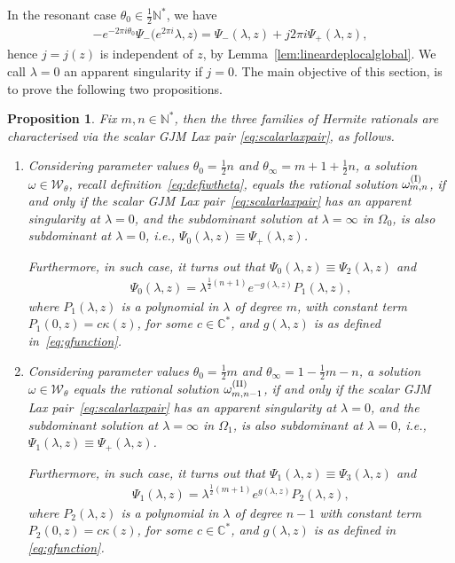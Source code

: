 \documentclass[pdftex]{sigma}
\numberwithin{equation}{section}
\newtheorem{pro}[thm]{Proposition}
\newcommand{\om}{\omega}
\newcommand{\la}{\lambda}
\begin{document}
In the resonant case $\theta_0\in \tfrac{1}{2}\mathbb{N}^*$, we have
\begin{gather*}
-e^{-2\pi i \theta_0}\Psi_-\big(e^{2\pi i}\lambda,z\big)=\Psi_-(\lambda,z)+j2\pi i \Psi_+(\lambda,z),
\end{gather*}
hence $j=j(z)$ is independent of $z$, by Lemma~\ref{lem:lineardeplocalglobal}. We call $\lambda=0$ an apparent singularity if $j=0$. The main objective of this section, is to prove the following two propositions.
\begin{pro}\label{pro:hermitecharacterisation}
	Fix $m,n\in\mathbb{N}^*$, then the three families of Hermite rationals are characterised via the scalar GJM Lax pair \eqref{eq:scalarlaxpair}, as follows.
	\begin{enumerate}[label={\rm H.\Roman*:}, ref={\rm H.\Roman*}]\itemsep=0pt
		\item Considering parameter values $\theta_0=\tfrac{1}{2}n$ and $\theta_\infty=m+1+\tfrac{1}{2}n$, a solution $\om\in \mathcal{W}_\theta$, recall definition~\eqref{eq:defiwtheta}, equals the rational solution $\om_{m,n}^{({\rm I})}$, if and only if the scalar GJM Lax pair~\eqref{eq:scalarlaxpair} has an apparent singularity at $\lambda=0$,
		and the subdominant solution at $\lambda=\infty$ in $\Omega_0$, is also subdominant at $\lambda=0$, i.e.,
		$\Psi_0(\lambda,z)\equiv \Psi_{+}(\lambda,z)$.
		
		Furthermore, in such case, it turns out that $\Psi_0(\lambda,z)\equiv \Psi_2(\lambda,z)$ and
		\begin{gather}\label{eq:h1psi0}
		\Psi_0(\lambda,z)=\lambda^{\frac{1}{2}(n+1)}e^{-g(\lambda,z)}P_1(\lambda,z),
		\end{gather}
		where $P_1(\lambda,z)$ is a polynomial in $\lambda$ of degree $m$, with constant term $P_1(0,z)=c\kappa(z)$, for some $c\in\mathbb{C}^*$,
		and $g(\la,z)$ is as defined in~\eqref{eq:gfunction}.		\label{H1general}

		\item Considering parameter values $\theta_0=\tfrac{1}{2}m$ and $\theta_\infty=1-\tfrac{1}{2}m-n$, a solution $\om\in \mathcal{W}_\theta$ equals the rational solution $\om_{m,n-1}^{({\rm II})}$, if and only if the scalar GJM Lax pair~\eqref{eq:scalarlaxpair} has an apparent singularity at $\lambda=0$,
		and the subdominant solution at $\lambda=\infty$ in $\Omega_1$, is also subdominant at $\lambda=0$, i.e.,
		$\Psi_1(\lambda,z)\equiv \Psi_{+}(\lambda,z)$.
	
		Furthermore, in such case, it turns out that $\Psi_1(\lambda,z)\equiv \Psi_3(\lambda,z)$ and
		\begin{gather*}%
		\Psi_1(\lambda,z)=\lambda^{\frac{1}{2}(m+1)}e^{g(\lambda,z)}P_2(\lambda,z),
		\end{gather*}
		where $P_2(\lambda,z)$ is a polynomial in $\lambda$ of degree $n-1$ with constant term $P_2(0,z)=c\kappa(z)$, for some $c\in\mathbb{C}^*$,
		and $g(\la,z)$ is as defined in \eqref{eq:gfunction}.				\label{H2general}


\end{enumerate}
\end{pro}
\end{document}
